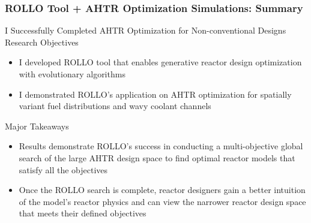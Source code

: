 \begin{frame}
    \frametitle{ROLLO Tool + AHTR Optimization Simulations: Summary}
    \begin{block}{I Successfully Completed AHTR Optimization for Non-conventional Designs
    Research Objectives}
    \begin{itemize}
        \item I developed \acrfull{ROLLO} tool that enables generative reactor design
        optimization with evolutionary algorithms 
        \item I demonstrated ROLLO's application on AHTR optimization for spatially variant 
        fuel distributions and wavy coolant channels
    \end{itemize}    
    \end{block}
    \begin{block}{Major Takeaways}
        \begin{itemize}
            \item Results demonstrate ROLLO's success in conducting a multi-objective 
            global search of the large AHTR design space to find optimal reactor models 
            that satisfy all the objectives
            \item Once the ROLLO search is complete, reactor designers gain a better 
            intuition of the model's reactor physics and can view the narrower reactor 
            design space that meets their defined objectives
        \end{itemize}
    \end{block}
\end{frame}